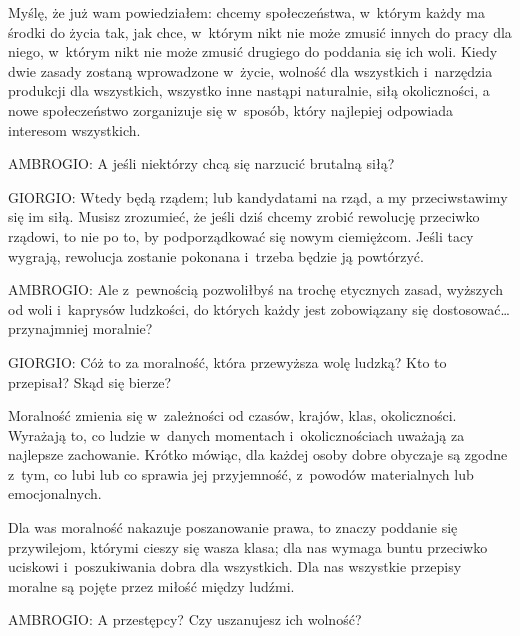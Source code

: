 \documentclass[oneside,polish,11pt,sfheadings]{mwbk}
\begin{document}
 
Myślę, że już wam powiedziałem: chcemy społeczeństwa, w~którym każdy ma środki do życia tak, jak chce, w~którym nikt nie
może zmusić innych do pracy dla niego, w~którym nikt nie może zmusić drugiego do poddania się ich woli. Kiedy dwie
zasady zostaną wprowadzone w~życie, wolność dla wszystkich i~narzędzia produkcji dla wszystkich, wszystko inne nastąpi
naturalnie, siłą okoliczności, a nowe społeczeństwo zorganizuje się w~sposób, który najlepiej odpowiada interesom
wszystkich. 




 
\noindent AMBROGIO: A jeśli niektórzy chcą się narzucić brutalną siłą? 




 
\noindent GIORGIO: Wtedy będą rządem; lub kandydatami na rząd, a my przeciwstawimy się im siłą. Musisz zrozumieć, że jeśli dziś
chcemy zrobić rewolucję przeciwko rządowi, to nie po to, by podporządkować się nowym ciemiężcom. Jeśli tacy wygrają,
rewolucja zostanie pokonana i~trzeba będzie ją powtórzyć. 




 
\noindent AMBROGIO: Ale z~pewnością pozwoliłbyś na trochę etycznych zasad, wyższych od woli i~kaprysów ludzkości, do których każdy
jest zobowiązany się dostosować\ldots przynajmniej moralnie? 




 
\noindent GIORGIO: Cóż to za moralność, która przewyższa wolę ludzką? Kto to przepisał? Skąd się bierze? 

 
Moralność zmienia się w~zależności od czasów, krajów, klas, okoliczności. Wyrażają to, co ludzie w~danych momentach i~okolicznościach uważają za najlepsze zachowanie. Krótko mówiąc, dla każdej osoby dobre obyczaje są zgodne z~tym, co
lubi lub co sprawia jej przyjemność, z~powodów materialnych lub emocjonalnych. 

 
Dla was moralność nakazuje poszanowanie prawa, to znaczy poddanie się przywilejom, którymi cieszy się wasza klasa; dla
nas wymaga buntu przeciwko uciskowi i~poszukiwania dobra dla wszystkich. Dla nas wszystkie przepisy moralne są pojęte
przez miłość między ludźmi. 




 
\noindent AMBROGIO: A przestępcy? Czy uszanujesz ich wolność? 
\end{document}
